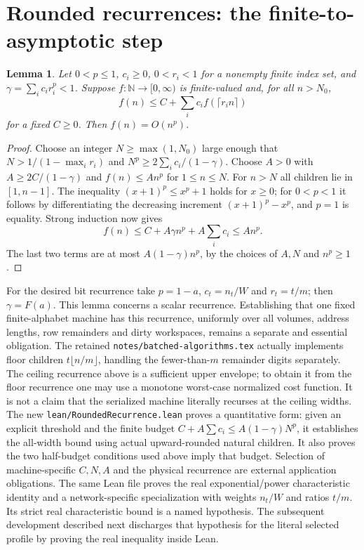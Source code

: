 \documentclass[11pt]{article}
\newtheorem{lemma}[theorem]{Lemma}
\begin{document}
\section{Rounded recurrences: the finite-to-asymptotic step}
\begin{lemma}\label{lem:rounded}
Let $0<p\le1$, $c_i\ge0$, $0<r_i<1$ for a nonempty finite index set,
and $\gamma=\sum_i c_i r_i^p<1$. Suppose $f:\mathbb N\to[0,\infty)$
is finite-valued and, for all $n>N_0$,
\[
 f(n)\le C+\sum_i c_i f(\lceil r_i n\rceil)
\]
for a fixed $C\ge0$. Then $f(n)=O(n^p)$.
\end{lemma}
\begin{proof}
Choose an integer $N\ge\max(1,N_0)$ large enough that
$N>1/(1-\max_i r_i)$ and
$N^p\ge2\sum_i c_i/(1-\gamma)$.
Choose $A>0$ with $A\ge2C/(1-\gamma)$ and
$f(n)\le An^p$ for $1\le n\le N$.
For $n>N$ all children lie in $[1,n-1]$.
The inequality $(x+1)^p\le x^p+1$ holds for $x\ge0$;
for $0<p<1$ it follows by differentiating the decreasing increment
$(x+1)^p-x^p$, and $p=1$ is equality.
Strong induction now gives
\[
 f(n)\le C+A\gamma n^p+A\sum_i c_i\le An^p.
\]
The last two terms are at most $A(1-\gamma)n^p$, by the choices of
$A,N$ and $n^p\ge1$.
\end{proof}
For the desired bit recurrence take $p=1-a$, $c_t=n_t/W$ and $r_t=t/m$;
then $\gamma=F(a)$. This lemma concerns a scalar recurrence. Establishing
that one fixed finite-alphabet machine has this recurrence, uniformly over
all volumes, address lengths, row remainders and dirty workspaces, remains a
separate and essential obligation.
The retained \texttt{notes/batched-algorithms.tex} actually implements floor
children $t\lfloor n/m\rfloor$, handling the fewer-than-$m$ remainder digits
separately. The ceiling recurrence above is a sufficient upper envelope;
to obtain it from the floor recurrence one may use a monotone worst-case
normalized cost function. It is not a claim that the serialized machine
literally recurses at the ceiling widths.
The new \texttt{lean/RoundedRecurrence.lean} proves a quantitative form:
given an explicit threshold and the finite budget
$C+A\sum c_i\le A(1-\gamma)N^p$, it establishes the all-width bound using
actual upward-rounded natural children. It also proves the two half-budget
conditions used above imply that budget. Selection of machine-specific
$C,N,A$ and the physical recurrence are external application obligations.
The same Lean file proves the real exponential/power characteristic identity
and a network-specific specialization with weights $n_t/W$ and ratios $t/m$.
Its strict real characteristic bound is a named hypothesis. The subsequent
development described next discharges that hypothesis for the literal
selected profile by proving the real inequality inside Lean.
\end{document}
